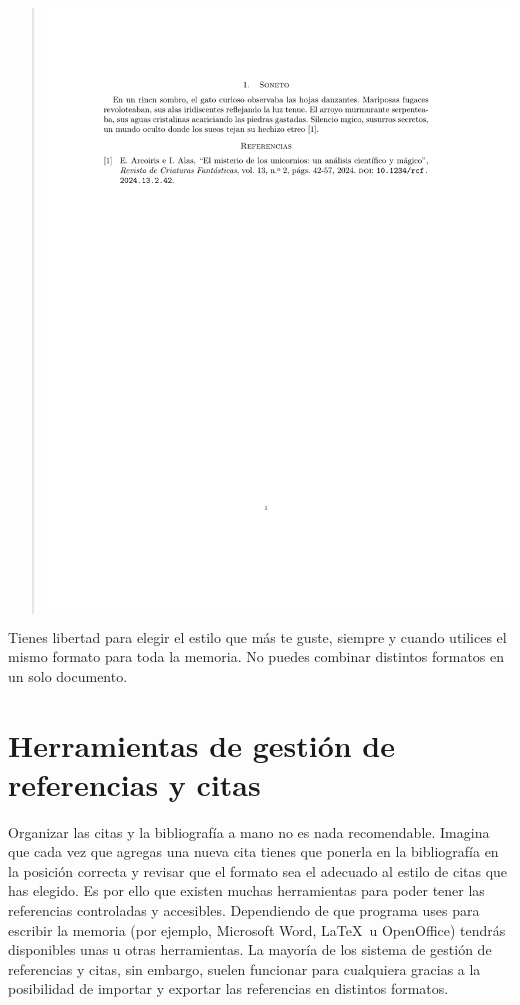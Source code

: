 \begin{itemize}
\begin{quote}
        \includegraphics[scale=0.6, trim={2cm 19cm 3cm 3cm}, clip]{images/ieee.pdf}
    \end{quote}
\end{itemize}

Tienes libertad para elegir el estilo que más te guste, siempre y cuando utilices el mismo formato para toda la memoria. No puedes combinar distintos formatos en un solo documento.

\section{Herramientas de gestión de referencias y citas}

Organizar las citas y la bibliografía a mano no es nada recomendable. Imagina que cada vez que agregas una nueva cita tienes que ponerla en la bibliografía en la posición correcta y revisar que el formato sea el adecuado al estilo de citas que has elegido. Es por ello que existen muchas herramientas para poder tener las referencias controladas y accesibles. Dependiendo de que programa uses para escribir la memoria (por ejemplo, Microsoft Word\texttrademark, \LaTeX\ u OpenOffice) tendrás disponibles unas u otras herramientas. La mayoría de los sistema de gestión de referencias y citas, sin embargo, suelen funcionar para cualquiera gracias a la posibilidad de importar y exportar las referencias en distintos formatos.


